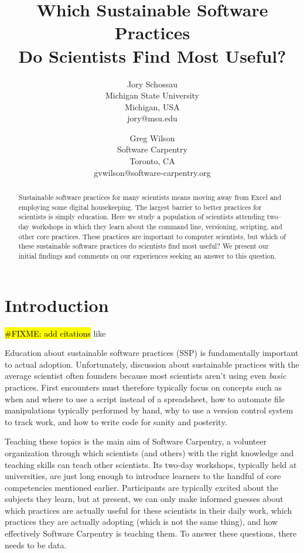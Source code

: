 \documentclass[10pt, twocolumn]{article}
\title{Which Sustainable Software Practices\\ Do Scientists Find Most Useful?}
\author{
	Jory Schossau \\
	\small{Michigan State University} \\
	\small{Michigan, USA} \\
	\small{jory@msu.edu}
	\and
	Greg Wilson \\
	\small{Software Carpentry} \\
	\small{Toronto, CA} \\
	\small{gvwilson@software-carpentry.org}
}
\newcommand{\fixme}[1]{\hl{\#FIXME: #1}}
\begin{document}
	\maketitle
	
	\begin{abstract}
	Sustainable software practices for many scientists 
	means moving away from Excel 
	and employing some digital housekeeping.
	The largest barrier to better practices for scientists is simply education.
	Here we study a population of scientists attending two--day workshops
	in which they learn about the command line, versioning, scripting, and other core practices.
	These practices are important to computer scientists, 
	but which of these sustainable software practices do scientists find most useful?
	We present our initial findings and comments on our experiences seeking an answer to this question.
	\end{abstract}
	
	\section{Introduction}
	
	\fixme{add citations} like \cite{b:hannay2009}
	
	Education about sustainable software practices (SSP)
	is fundamentally important to actual adoption.
	Unfortunately,
	discussion about sustainable practices with the average scientist often founders
	because most scientists aren't using even \emph{basic} practices.
	First encounters must therefore typically focus on concepts such as
	when and where to use a script instead of a spreadsheet,
	how to automate file manipulations typically performed by hand,
	why to use a version control system to track work,
	and how to write code for sanity and posterity.
	
	Teaching these topics is the main aim of Software Carpentry,
	a volunteer organization through which scientists (and others)
	with the right knowledge and teaching skills can teach other scientists.
	Its two-day workshops,
	typically held at universities,
	are just long enough to introduce learners to the handful of core competencies mentioned earlier.
	Participants are typically excited about the subjects they learn,
	but at present,
	we can only make informed guesses about
	which practices are actually useful for these scientists in their daily work,
	which practices they are actually adopting (which is not the same thing),
	and how effectively Software Carpentry is teaching them.
	To answer these questions,
	there needs to be data.
	
\end{document}
